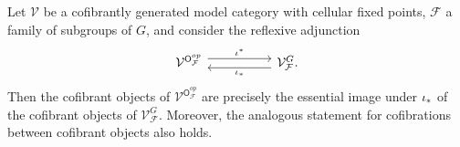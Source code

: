 \documentclass[a4paper,10pt]{article}%
\begin{document}
\begin{proposition}\label{COFESSIM PROP}
	Let $\mathcal{V}$ be a cofibrantly generated model category with cellular fixed points, $\mathcal{F}$ a family of subgroups of $G$,
	and consider the reflexive adjunction
\begin{equation}\label{COFADJ EQ}
\begin{tikzcd}[column sep =5em]
	\mathcal{V}^{\mathsf{O}_{\mathcal{F}}^{op}}
	\ar[shift left=1.5]{r}{\iota^{\**}} 
&
	\mathcal{V}^G_{\mathcal{F}}
	\ar[shift left=1.5]{l}{\iota_{\**}}.
\end{tikzcd}
\end{equation}
Then the cofibrant objects of 
$\mathcal{V}^{\mathsf{O}_{\mathcal{F}}^{op}}$
are precisely the essential image under $\iota_{\**}$
of the cofibrant objects of
$\mathcal{V}^G_{\mathcal{F}}$.
Moreover, the analogous statement for cofibrations between cofibrant objects also holds.
\end{proposition}
\end{document}
